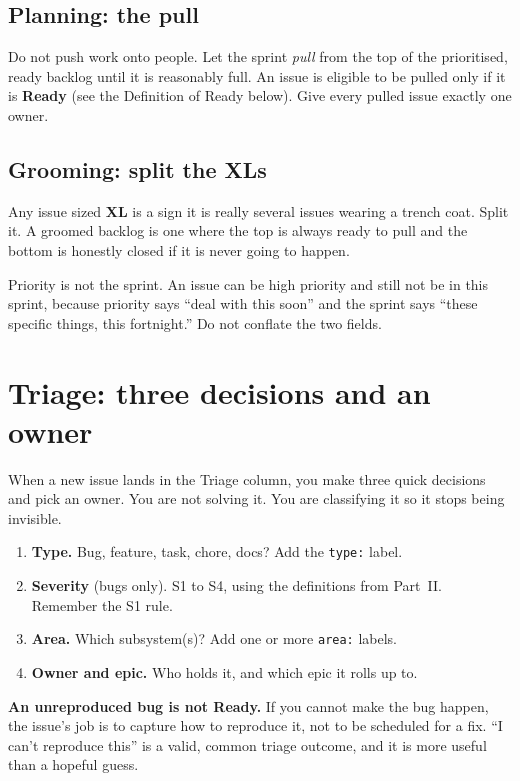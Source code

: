 \documentclass[11pt,a4paper]{report}
\newcommand{\code}[1]{\texttt{#1}}
\begin{document}
\section{Planning: the pull}
Do not push work onto people. Let the sprint \emph{pull} from the top of the
prioritised, ready backlog until it is reasonably full. An issue is eligible to be
pulled only if it is \textbf{Ready} (see the Definition of Ready below). Give every
pulled issue exactly one owner.

\section{Grooming: split the XLs}
Any issue sized \textbf{XL} is a sign it is really several issues wearing a trench
coat. Split it. A groomed backlog is one where the top is always ready to pull and
the bottom is honestly closed if it is never going to happen.

\begin{notebox}
Priority is not the sprint. An issue can be high priority and still not be in this
sprint, because priority says ``deal with this soon'' and the sprint says ``these
specific things, this fortnight.'' Do not conflate the two fields.
\end{notebox}

\chapter{Triage: three decisions and an owner}

When a new issue lands in the Triage column, you make three quick decisions and pick
an owner. You are not solving it. You are classifying it so it stops being invisible.

\begin{enumerate}[leftmargin=1.6em,itemsep=3pt]
  \item \textbf{Type.} Bug, feature, task, chore, docs? Add the \code{type:} label.
  \item \textbf{Severity} (bugs only). S1 to S4, using the definitions from
        Part~II. Remember the S1 rule.
  \item \textbf{Area.} Which subsystem(s)? Add one or more \code{area:} labels.
  \item \textbf{Owner and epic.} Who holds it, and which epic it rolls up to.
\end{enumerate}

\begin{gotcha}
\textbf{An unreproduced bug is not Ready.} If you cannot make the bug happen, the
issue's job is to capture how to reproduce it, not to be scheduled for a fix. ``I
can't reproduce this'' is a valid, common triage outcome, and it is more useful than
a hopeful guess.
\end{gotcha}
\end{document}
